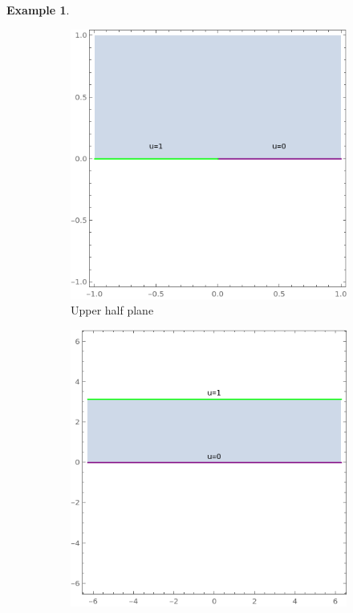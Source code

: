 \documentclass[a4paper, 12pt]{article}
\theoremstyle{definition}
\newtheorem{example}{Example}
\numberwithin{theorem}{section}
\numberwithin{definition}{section}
\numberwithin{exercise}{section}
\numberwithin{remark}{section}
\numberwithin{figure}{section}
\numberwithin{example}{section}
\begin{document}
\begin{example}
\begin{figure}[tbp]
\begin{subfigure}[b]{0.4\textwidth}
            \includegraphics[width=\textwidth]{LaplaceEquation4}
            \caption{Upper half plane}
        \end{subfigure}
        \begin{subfigure}[b]{0.4\textwidth}
            \centering
            \includegraphics[width=\textwidth]{LaplaceEquation5}

\end{subfigure}
\end{figure}
\end{example}
\end{document}
